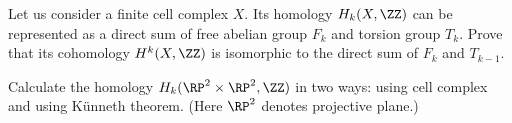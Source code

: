 




\exercises
\begin{xca}
Let us consider a finite cell complex $X$. Its homology
$H_k(X,\ZZ)$ can be represented as a direct sum of free abelian
group $F_k$ and torsion group $T_k$. Prove that its cohomology
$H^k(X,\ZZ)$ is isomorphic to the direct sum of $F_k$ and
$T_{k-1}$.
\end{xca}
\begin{xca}
Calculate the homology $H_k(\RP^2\times\RP^2, \ZZ)$ in two ways:
using cell complex and using K\"unneth theorem. (Here $\RP^2$
denotes projective plane.)
\end{xca}
